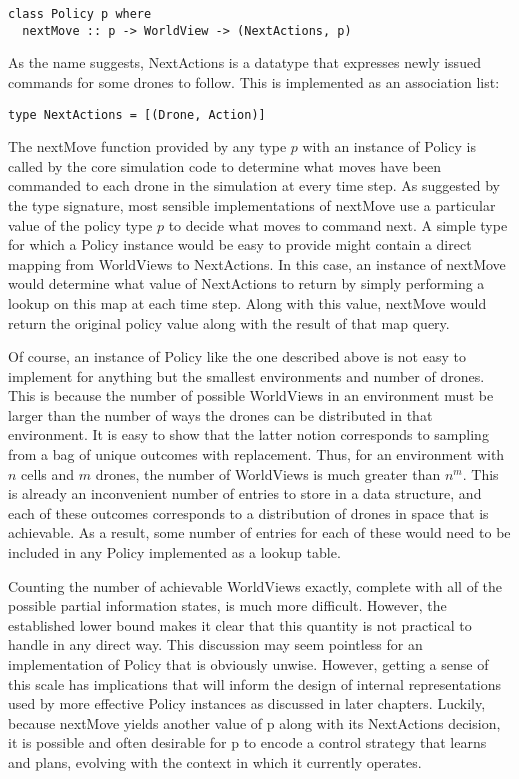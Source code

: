\begin{verbatim}
class Policy p where
  nextMove :: p -> WorldView -> (NextActions, p)
\end{verbatim}

As the name suggests, NextActions is a datatype that expresses newly issued commands for some drones to follow. This is implemented as an association list:

\begin{verbatim}
type NextActions = [(Drone, Action)]
\end{verbatim}

The nextMove function provided by any type $p$ with an instance of Policy is called by the core simulation code to determine what moves have been commanded to each drone in the simulation at every time step. As suggested by the type signature, most sensible implementations of nextMove use a particular value of the policy type $p$ to decide what moves to command next. A simple type for which a Policy instance would be easy to provide might contain a direct mapping from WorldViews to NextActions. In this case, an instance of nextMove would determine what value of NextActions to return by simply performing a lookup on this map at each time step. Along with this value, nextMove would return the original policy value along with the result of that map query. 

Of course, an instance of Policy like the one described above is not easy to implement for anything but the smallest environments and number of drones. This is because the number of possible WorldViews in an environment must be larger than the number of ways the drones can be distributed in that environment. It is easy to show that the latter notion corresponds to sampling from a bag of unique outcomes with replacement. Thus, for an environment with $n$ cells and $m$ drones, the number of WorldViews is much greater than $n^m$. This is already an inconvenient number of entries to store in a data structure, and each of these outcomes corresponds to a distribution of drones in space that is achievable. As a result, some number of entries for each of these would need to be included in any Policy implemented as a lookup table.

Counting the number of achievable WorldViews exactly, complete with all of the possible partial information states, is much more difficult. However, the established lower bound makes it clear that this quantity is not practical to handle in any direct way. This discussion may seem pointless for an implementation of Policy that is obviously unwise. However, getting a sense of this scale has implications that will inform the design of internal representations used by more effective Policy instances as discussed in later chapters. Luckily, because nextMove yields another value of p along with its NextActions decision, it is possible and often desirable for p to encode a control strategy that learns and plans, evolving with the context in which it currently operates.

